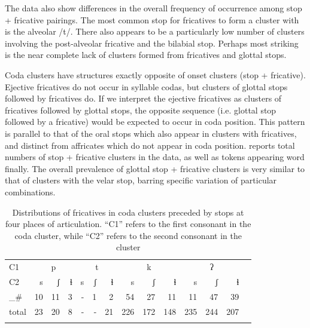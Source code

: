 \documentclass[output=paper,colorlinks,citecolor=brown]{langscibook}
\begin{document}
The data also show differences in the overall frequency of occurrence among stop + fricative pairings. The most common stop for fricatives to form a cluster with is the alveolar /t/. There also appears to be a particularly low number of clusters involving the post-alveolar fricative and the bilabial stop. Perhaps most striking is the near complete lack of clusters formed from fricatives and glottal stops. 

\label{paragraph:codaClusters}
Coda clusters have structures exactly opposite of onset clusters (stop + fricative). Ejective fricatives do not occur in syllable codas, but clusters of glottal stops followed by fricatives do. If we interpret the ejective fricatives as clusters of fricatives followed by glottal stops, the opposite sequence (i.e. glottal stop followed by a fricative) would be expected to occur in coda position. This pattern is parallel to that of the oral stops which also appear in clusters with fricatives, and distinct from affricates which do not appear in coda position.  reports total numbers of stop + fricative clusters in the data, as well as tokens appearing word finally. The overall prevalence of glottal stop + fricative clusters is very similar to that of clusters with the velar stop, barring specific variation of particular combinations.

\begin{table}
    \caption{Distributions of fricatives in coda clusters preceded by stops at four places of articulation. ``C1'' refers to the first consonant in the coda cluster, while ``C2'' refers to the second consonant in the cluster}
    \label{tab:codaclusters}
    \begin{tabular}{l rrr rrr rrr rrrr}
    \lsptoprule
    C1 & \multicolumn{3}{c}{p} & \multicolumn{3}{c}{t}  & \multicolumn{3}{c}{k} & \multicolumn{3}{c}{ʔ}\\\cmidrule(lr){2-4}\cmidrule(lr){5-7}\cmidrule(lr){8-10}\cmidrule{11-13}
    C2 & s & {ʃ} & ɬ & s & {ʃ} & ɬ & s & {ʃ} & ɬ & s & {ʃ} & ɬ \\\midrule
    \_\#& 10 & 11 & 3 & - & 1 & 2 & 54 & 27 & 11 & 11 & 47 & 39\\
    total & 23 & 20 & 8 & - & - & 21 & 226 & 172 & 148 & 235 & 244 & 207 \\
    \lspbottomrule
    \end{tabular}
\end{table}
\end{document}
